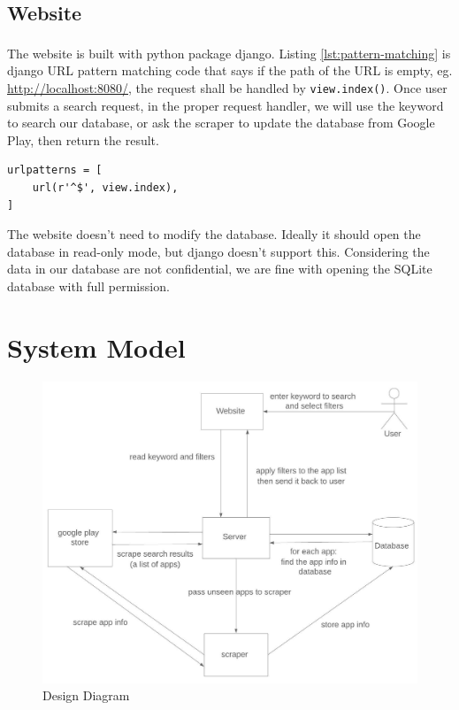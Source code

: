 \documentclass[12pt, a4paper]{article}
\newcommand{\code}[1]{\texttt{#1}}
\begin{document}
\subsection{Website}
The website is built with python package django\textsuperscript{\cite{django}}. Listing \ref{lst:pattern-matching} is django URL pattern matching code that says if the path of the URL is empty, eg. \url{http://localhost:8080/}, the request shall be handled by \code{view.index()}. Once user submits a search request, in the proper request handler, we will use the keyword to search our database, or ask the scraper to update the database from Google Play, then return the result.

\begin{lstlisting}[frame=tb, caption=urls.py, label=lst:pattern-matching]
urlpatterns = [
    url(r'^$', view.index),
]
\end{lstlisting}

The website doesn't need to modify the database. Ideally it should open the database in read-only mode, but django doesn't support this. Considering the data in our database are not confidential, we are fine with opening the SQLite database with full permission.

\section{System Model}

\begin{figure}[ht]
\centering
\includegraphics[width=\textwidth]{Context_Diagram.jpeg}
\caption{Design Diagram}
\label{fig:design_diagram}
\end{figure}
\end{document}
